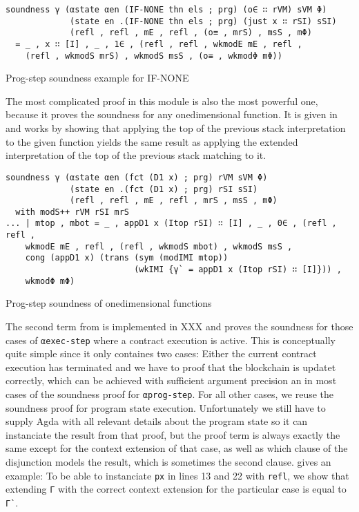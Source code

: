 \begin{listing}[!ht]
\begin{verbatim}
soundness γ (αstate αen (IF-NONE thn els ; prg) (o∈ ∷ rVM) sVM Φ)
             (state en .(IF-NONE thn els ; prg) (just x ∷ rSI) sSI)
             (refl , refl , mE , refl , (o≡ , mrS) , msS , mΦ)
  = _ , x ∷ [I] , _ , 1∈ , (refl , refl , wkmodE mE , refl ,
    (refl , wkmodS mrS) , wkmodS msS , (o≡ , wkmodΦ mΦ))
\end{verbatim}
\caption{Prog-step soundness example for IF-NONE}
\label{ps-sound-IF-NONE}
\end{listing}

The most complicated proof in this module is also the most powerful one, because it proves
the soundness for any onedimensional function.
It is given in  and works by showing that applying the top of the previous
stack interpretation to the given function yields the same result as applying
the extended interpretation of the top of the previous stack matching to it.

\begin{listing}[!ht]
\begin{verbatim}
soundness γ (αstate αen (fct (D1 x) ; prg) rVM sVM Φ)
             (state en .(fct (D1 x) ; prg) rSI sSI)
             (refl , refl , mE , refl , mrS , msS , mΦ)
  with modS++ rVM rSI mrS
... | mtop , mbot = _ , appD1 x (Itop rSI) ∷ [I] , _ , 0∈ , (refl , refl ,
    wkmodE mE , refl , (refl , wkmodS mbot) , wkmodS msS ,
    cong (appD1 x) (trans (sym (modIMI mtop))
                          (wkIMI {γ` = appD1 x (Itop rSI) ∷ [I]})) ,
    wkmodΦ mΦ)
\end{verbatim}
\caption{Prog-step soundness of onedimensional functions}
\label{ps-sound-D1}
\end{listing}

The second term from  is implemented in XXX
and proves the soundness for those cases of \verb/αexec-step/
where a contract execution is active.
This is conceptually quite simple since it only containes two cases:
Either the current contract execution has terminated and we have to proof that
the blockchain is updatet correctly, which can be achieved with sufficient
argument precision an in most cases of the soundness proof for \verb/αprog-step/.
For all other cases, we reuse the soundness proof for program state execution.
Unfortunately we still have to supply Agda with all relevant details about the program state
so it can instanciate the result from that proof, but the proof term is always exactly the
same except for the context extension of that case,
as well as which clause of the disjunction models the result, which is sometimes the second clause.
 gives an example: To be able to instanciate \verb/px/ 
in lines 13 and 22 with \verb/refl/,
we show that extending \verb/Γ/ with the correct context extension for the
particular case is equal to \verb/Γ`/.

